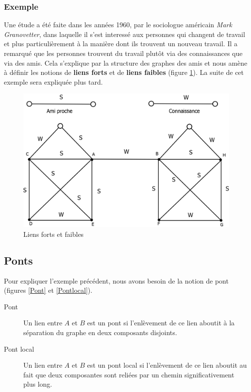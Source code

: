 \subsubsection*{Exemple}
Une étude a été faite dans les années 1960, par le sociologue américain \textit{Mark Granovetter}, dans laquelle il s'est interessé aux personnes qui changent de travail et plus particulièrement à la manière dont ils trouvent un nouveau travail. Il a remarqué que les personnes trouvent du travail plutôt via des connaissances que via des amis. Cela s'explique par la structure des graphes des amis et nous amène à définir les notions de \textbf{liens forts} et de \textbf{liens faibles} (figure \ref{liens_forts_et_faibles}). La suite de cet exemple sera expliquée plus tard.\\
	\begin{figure}[!h]
	\center
	\includegraphics[scale=0.4]{images/18_liens_forts_et_faibles.png}
	\caption{\label{liens_forts_et_faibles} Liens forts et faibles}
	\end{figure}

    
\subsection{Ponts}
Pour expliquer l'exemple précédent, nous avons besoin de la notion de pont (figures \ref{Pont} et \ref{Pontlocal}).
	\begin{description}
	\item[Pont] Un lien entre $A$ et $B$ est un pont si l'enlèvement de ce lien aboutit à la séparation du graphe en deux composants disjoints.
    \item[Pont local] Un lien entre $A$ et $B$ est un pont local si l'enlèvement de ce lien aboutit au fait que deux composantes sont reliées par un chemin significativement plus long.
    \end{description}
    
